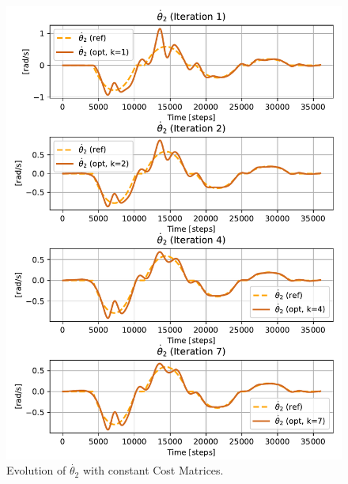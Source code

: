\begin{figure}[htb]
    \centering
    \includegraphics[width=1\linewidth]{img/2-task2/t2d_const.pdf}
    \caption{Evolution of $\dot{\theta_2}$ with constant Cost Matrices.}
    \label{fig:th2_const_}
\end{figure}

